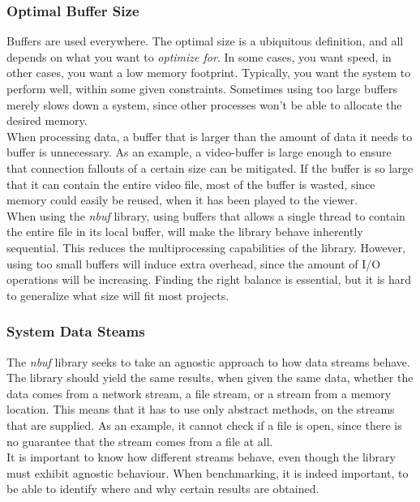 \documentclass[a4paper]{article}
\newcommand{\nbuf}{\textit{nbuf} }
\begin{document}
\subsubsection{Optimal Buffer Size}
Buffers are used everywhere. The optimal size is a ubiquitous definition, and all depends on what you want to \textit{optimize for}. In some cases, you want speed, in other cases, you want a low memory footprint. Typically, you want the system to perform well, within some given constraints. Sometimes using too large buffers merely slows down a system, since other processes won't be able to allocate the desired memory.\\

When processing data, a buffer that is larger than the amount of data it needs to buffer is unnecessary. As an example, a video-buffer is large enough to ensure that connection fallouts of a certain size can be mitigated. If the buffer is so large that it can contain the entire video file, most of the buffer is wasted, since memory could easily be reused, when it has been played to the viewer.\\

When using the \nbuf library, using buffers that allows a single thread to contain the entire file in its local buffer, will make the library behave inherently sequential. This reduces the multiprocessing capabilities of the library. However, using too small buffers will induce extra overhead, since the amount of I/O operations will be increasing. Finding the right balance is essential, but it is hard to generalize what size will fit most projects.


\subsubsection{System Data Steams}
The \nbuf library seeks to take an agnostic approach to how data streams behave. The library should yield the same results, when given the same data, whether the data comes from a network stream, a file stream, or a stream from a memory location. This means that it has to use only abstract methods, on the streams that are supplied. As an example, it cannot check if a file is open, since there is no guarantee that the stream comes from a file at all.\\

It is important to know how different streams behave, even though the library must exhibit agnostic behaviour. When benchmarking, it is indeed important, to be able to identify where and why certain results are obtained.\\
\end{document}

